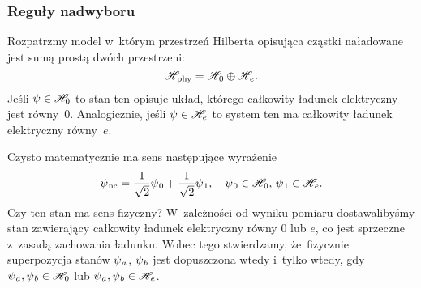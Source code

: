\documentclass[10pt,t]{beamer}
\begin{document}
\begin{frame}
  \frametitle{Reguły nadwyboru}


  Rozpatrzmy model w~którym przestrzeń Hilberta opisująca cząstki
  naładowane jest sumą prostą dwóch przestrzeni:
  \begin{equation}
    \label{eq:Glowne-rodzaje-problemow-podczerwonych-01}
    \mathcal{H}_{ \hspace{0.07em} \text{phy} } =
    \mathcal{H}_{ \hspace{0.07em} 0 } \oplus \mathcal{H}_{ \hspace{0.07em} e }.
  \end{equation}
  Jeśli $\psi \in \mathcal{H}_{ 0 }$ to stan ten opisuje układ, którego całkowity
  ładunek elektryczny jest równy~$0$. Analogicznie, jeśli
  $\psi \in \mathcal{H}_{ e }$ to system ten ma całkowity ładunek elektryczny
  równy~$e$.

  Czysto matematycznie ma sens następujące wyrażenie
  \begin{equation}
    \label{eq:Glowne-rodzaje-problemow-podczerwonych-02}
    \psi_{ \hspace{0.07em} \text{nc} } =
    \frac{ 1 }{ \sqrt{ 2 } } \psi_{ \hspace{0.07em} 0 } +
    \frac{ 1 }{ \sqrt{ 2 } } \psi_{ \hspace{0.07em} 1 }, \quad
    \psi_{ \hspace{0.07em} 0 } \in \mathcal{H}_{ \hspace{0.07em} 0 }, \,
    \psi_{ \hspace{0.07em} 1 } \in \mathcal{H}_{ \hspace{0.07em} e }.
  \end{equation}
  Czy ten stan ma sens fizyczny? W~zależności od wyniku pomiaru
  dostawalibyśmy stan zawierający całkowity ładunek elektryczny równy
  $0$ lub $e$, co jest sprzeczne z~zasadą zachowania ładunku. Wobec tego
  stwierdzamy, że~\alert{fizycznie} superpozycja stanów
  $\psi_{ \hspace{0.05em} a }$, $\psi_{ \hspace{0.05em} b }$ jest dopuszczona wtedy i~tylko
  wtedy, gdy $\psi_{ \hspace{0.05em} a }, \psi_{ \hspace{0.05em} b } \in \mathcal{H}_{ \hspace{0.07em} 0 }$
  lub $\psi_{ \hspace{0.05em} a }, \psi_{ \hspace{0.05em} b } \in \mathcal{H}_{ \hspace{0.07em} e }$.

\end{frame}
\end{document}
